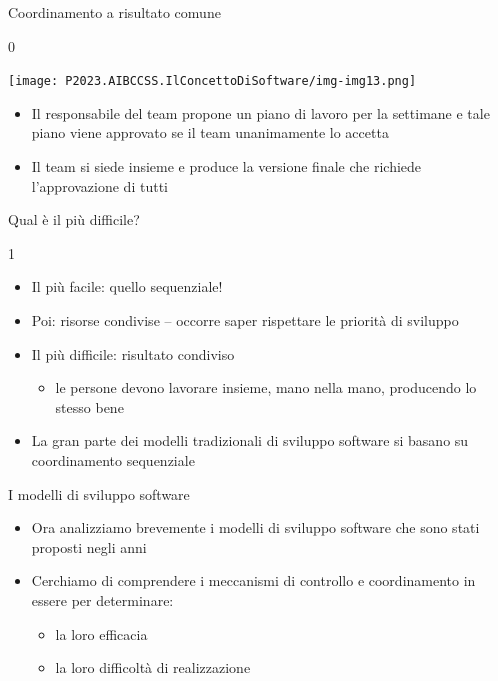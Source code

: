 \documentclass{beamer}
\begin{document}
\begin{frame}{\centerline{Coordinamento a risultato comune}}
0
\begin{center}
\texttt{[image: P2023.AIBCCSS.IlConcettoDiSoftware/img-img13.png]}
\end{center}

\begin{itemize}
\item  Il responsabile del team propone un piano di lavoro per la settimane e tale piano viene approvato se il team unanimamente lo accetta

\item Il team si siede insieme e produce la versione finale che richiede l'approvazione di tutti

  
\end{itemize}


\end{frame}

\begin{frame}{\centerline{Qual \`{e} il pi\`{u} difficile?}}
1
\begin{itemize}

\item  Il pi\`{u} facile: quello sequenziale!
\item  Poi: risorse condivise -- occorre saper rispettare le priorit\`{a} di sviluppo
\item  Il pi\`{u} difficile: risultato condiviso
\begin{itemize}

\item  le persone devono lavorare insieme, mano nella mano, producendo lo stesso bene
\end{itemize}

\item La gran parte dei modelli tradizionali di sviluppo software si basano su coordinamento sequenziale

\end{itemize}

\end{frame}


\begin{frame}{\centerline{I modelli di sviluppo software}}

\begin{itemize}
\item Ora analizziamo brevemente i modelli di sviluppo software che sono stati proposti negli anni
\item Cerchiamo di comprendere i meccanismi di controllo e coordinamento in essere per determinare:
\begin{itemize}
\item la loro efficacia
\item la loro difficolt\`{a} di realizzazione 
\end{itemize}
\end{itemize}
\end{frame}
\end{document}
